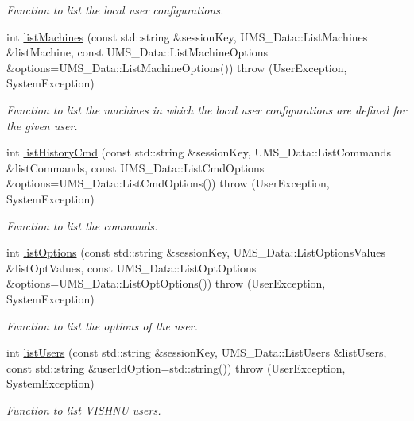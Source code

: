 \begin{DoxyCompactItemize}
\begin{DoxyCompactList}\small\item\em Function to list the local user configurations. \item\end{DoxyCompactList}\item 
int \hyperlink{namespacevishnu_a1173c380a74b87ee3f3e0651628ad800}{listMachines} (const std::string \&sessionKey, UMS\_\-Data::ListMachines \&listMachine, const UMS\_\-Data::ListMachineOptions \&options=UMS\_\-Data::ListMachineOptions())  throw (UserException, SystemException)
\begin{DoxyCompactList}\small\item\em Function to list the machines in which the local user configurations are defined for the given user. \item\end{DoxyCompactList}\item 
int \hyperlink{namespacevishnu_a8576a50af31abe3869a61bec780aa5ef}{listHistoryCmd} (const std::string \&sessionKey, UMS\_\-Data::ListCommands \&listCommands, const UMS\_\-Data::ListCmdOptions \&options=UMS\_\-Data::ListCmdOptions())  throw (UserException, SystemException)
\begin{DoxyCompactList}\small\item\em Function to list the commands. \item\end{DoxyCompactList}\item 
int \hyperlink{namespacevishnu_a53106e021a6e98049b41106c12356e28}{listOptions} (const std::string \&sessionKey, UMS\_\-Data::ListOptionsValues \&listOptValues, const UMS\_\-Data::ListOptOptions \&options=UMS\_\-Data::ListOptOptions())  throw (UserException, SystemException)
\begin{DoxyCompactList}\small\item\em Function to list the options of the user. \item\end{DoxyCompactList}\item 
int \hyperlink{namespacevishnu_a6a0175686b0d2aff434015fc61c62ce6}{listUsers} (const std::string \&sessionKey, UMS\_\-Data::ListUsers \&listUsers, const std::string \&userIdOption=std::string())  throw (UserException, SystemException)
\begin{DoxyCompactList}\small\item\em Function to list VISHNU users. \item\end{DoxyCompactList}\item 

\end{DoxyCompactItemize}
